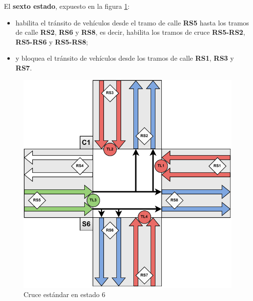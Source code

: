 \newpage
El \textbf{sexto estado}, expuesto en la figura \ref{fig:cruce_estandar_estado_6}:
\begin{itemize}
    \item habilita el tránsito de vehículos desde el tramo de calle \textbf{RS5} hasta los tramos de calle \textbf{RS2}, \textbf{RS6} y \textbf{RS8}, es decir, habilita los tramos de cruce \textbf{RS5-RS2}, \textbf{RS5-RS6} y \textbf{RS5-RS8};
    \item y bloquea el tránsito de vehículos desde los tramos de calle \textbf{RS1}, \textbf{RS3} y \textbf{RS7}.
\end{itemize}
\begin{figure}[H]
    \centering
    \includegraphics[width=1\linewidth]{text/image/DCruc-CE-Estado6.pdf}
    \caption{Cruce estándar en estado 6}
    \label{fig:cruce_estandar_estado_6}
\end{figure}

\newpage
